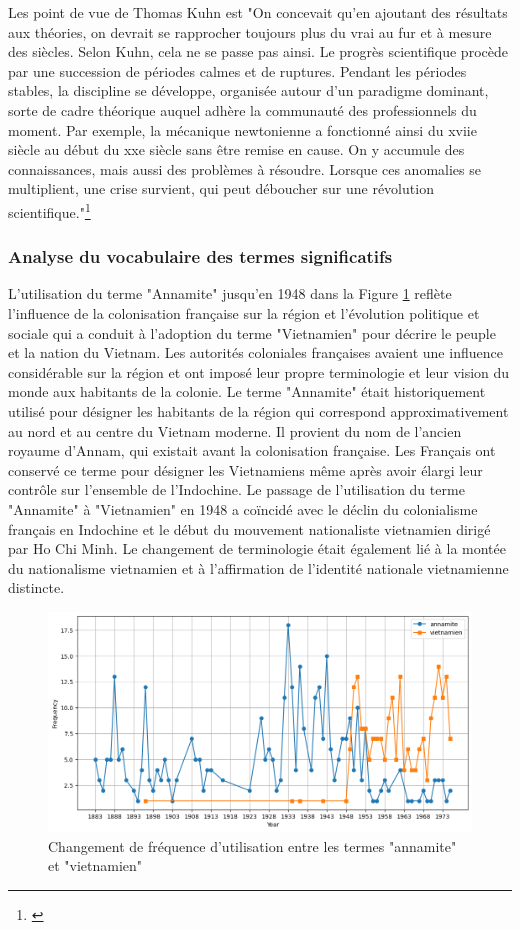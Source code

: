  Les point de vue de Thomas Kuhn est "On  concevait  qu’en  ajoutant des résultats aux théories, on devrait se rapprocher toujours plus  du  vrai  au  fur  et  à  mesure  des  siècles.  Selon  Kuhn,  cela  ne  se  passe pas ainsi. Le progrès scientifique procède par une succession de périodes calmes et de ruptures. Pendant les périodes stables, la discipline se  développe,  organisée  autour  d’un  paradigme  dominant,  sorte  de  cadre théorique auquel adhère la communauté des professionnels du moment. Par exemple, la mécanique newtonienne a fonctionné ainsi du xviie siècle au début du xxe siècle sans être remise en cause. On y accumule des connaissances, mais aussi des problèmes à résoudre. Lorsque ces anomalies se multiplient, une crise survient, qui peut déboucher  sur  une  révolution  scientifique."\footnote{\cite{thomaskun08}}

 
\subsubsection{Analyse du vocabulaire des termes significatifs}

L'utilisation du terme "Annamite" jusqu'en 1948 dans la Figure \ref{fig:ananm_viet} reflète l'influence de la colonisation française sur la région et l'évolution politique et sociale qui a conduit à l'adoption du terme "Vietnamien" pour décrire le peuple et la nation du Vietnam. Les autorités coloniales françaises avaient une influence considérable sur la région et ont imposé leur propre terminologie et leur vision du monde aux habitants de la colonie. Le terme "Annamite" était historiquement utilisé pour désigner les habitants de la région qui correspond approximativement au nord et au centre du Vietnam moderne. Il provient du nom de l'ancien royaume d'Annam, qui existait avant la colonisation française. Les Français ont conservé ce terme pour désigner les Vietnamiens même après avoir élargi leur contrôle sur l'ensemble de l'Indochine. Le passage de l'utilisation du terme "Annamite" à "Vietnamien" en 1948 a coïncidé avec le déclin du colonialisme français en Indochine et le début du mouvement nationaliste vietnamien dirigé par Ho Chi Minh. Le changement de terminologie était également lié à la montée du nationalisme vietnamien et à l'affirmation de l'identité nationale vietnamienne distincte.

\begin{figure}[H] %
    \centering
    \includegraphics[width=12cm]{img/vietnam_annamite.png}
    \caption{Changement de fréquence d'utilisation entre les termes "annamite" et "vietnamien"}
    \label{fig:ananm_viet}
\end{figure}

